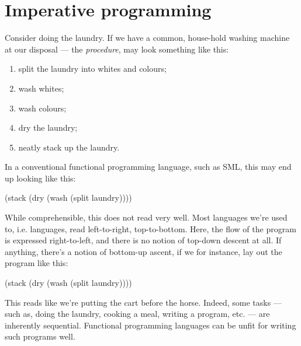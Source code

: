 \chapter{Imperative programming}

Consider doing the laundry. If we have a common, house-hold washing machine at
our disposal --- the \emph{procedure}, may look something like this:

\begin{enumerate}

\item split the laundry into whites and colours;

\item wash whites;

\item wash colours;

\item dry the laundry;

\item neatly stack up the laundry.

\end{enumerate}

In a conventional functional programming language, such as SML, this may end up
looking like this:

\begin{code}
(stack (dry (wash (split laundry))))
\end{code}

While comprehensible, this does not read very well. Most languages we're used
to, i.e.  languages, read
left-to-right, top-to-bottom. Here, the flow of the program is expressed
right-to-left, and there is no notion of top-down descent at all. If anything,
there's a notion of bottom-up ascent, if we for instance, lay out the program
like this:

\begin{code}
(stack
  (dry
    (wash
      (split laundry))))
\end{code}

This reads like we're putting the cart before the horse. Indeed, some tasks ---
such as, doing the laundry, cooking a meal, writing a program, etc. --- are
inherently sequential. Functional programming languages can be
 unfit for writing such programs
well.


